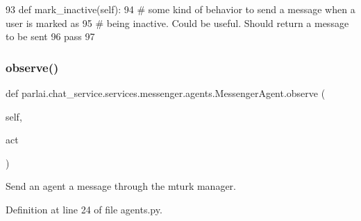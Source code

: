 \begin{DoxyCode}
93     \textcolor{keyword}{def }mark\_inactive(self):
94         \textcolor{comment}{# some kind of behavior to send a message when a user is marked as}
95         \textcolor{comment}{# being inactive. Could be useful. Should return a message to be sent}
96         \textcolor{keywordflow}{pass}
97 
\end{DoxyCode}
\mbox{\label{classparlai_1_1chat__service_1_1services_1_1messenger_1_1agents_1_1MessengerAgent_aed8303ffef9e83bb5071ce7ab4f77bc6}} 
\subsubsection{\texorpdfstring{observe()}{observe()}}
{\footnotesize\ttfamily def parlai.\+chat\+\_\+service.\+services.\+messenger.\+agents.\+Messenger\+Agent.\+observe (\begin{DoxyParamCaption}\item[{}]{self,  }\item[{}]{act }\end{DoxyParamCaption})}

\begin{DoxyVerb}Send an agent a message through the mturk manager.
\end{DoxyVerb}
 

Definition at line 24 of file agents.\+py.



